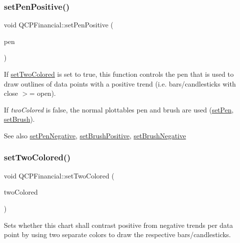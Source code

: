 \subsubsection{\texorpdfstring{set\+Pen\+Positive()}{setPenPositive()}}
{\footnotesize\ttfamily void Q\+C\+P\+Financial\+::set\+Pen\+Positive (\begin{DoxyParamCaption}\item[{const Q\+Pen \&}]{pen }\end{DoxyParamCaption})}

If \mbox{\hyperlink{class_q_c_p_financial_a138e44aac160a17a9676652e240c5f08}{set\+Two\+Colored}} is set to true, this function controls the pen that is used to draw outlines of data points with a positive trend (i.\+e. bars/candlesticks with close $>$= open).

If {\itshape two\+Colored} is false, the normal plottable\textquotesingle{}s pen and brush are used (\mbox{\hyperlink{class_q_c_p_abstract_plottable_ab74b09ae4c0e7e13142fe4b5bf46cac7}{set\+Pen}}, \mbox{\hyperlink{class_q_c_p_abstract_plottable_a7a4b92144dca6453a1f0f210e27edc74}{set\+Brush}}).

\begin{DoxySeeAlso}{See also}
\mbox{\hyperlink{class_q_c_p_financial_afe5c07e94ccea01a75b3a2476993c346}{set\+Pen\+Negative}}, \mbox{\hyperlink{class_q_c_p_financial_a5ebff2b1764efd07cc44942e67821829}{set\+Brush\+Positive}}, \mbox{\hyperlink{class_q_c_p_financial_a8bbdd87629f9144b3ef51af660c0961a}{set\+Brush\+Negative}} 
\end{DoxySeeAlso}
\mbox{\label{class_q_c_p_financial_a138e44aac160a17a9676652e240c5f08}} 
\subsubsection{\texorpdfstring{set\+Two\+Colored()}{setTwoColored()}}
{\footnotesize\ttfamily void Q\+C\+P\+Financial\+::set\+Two\+Colored (\begin{DoxyParamCaption}\item[{bool}]{two\+Colored }\end{DoxyParamCaption})}

Sets whether this chart shall contrast positive from negative trends per data point by using two separate colors to draw the respective bars/candlesticks.

